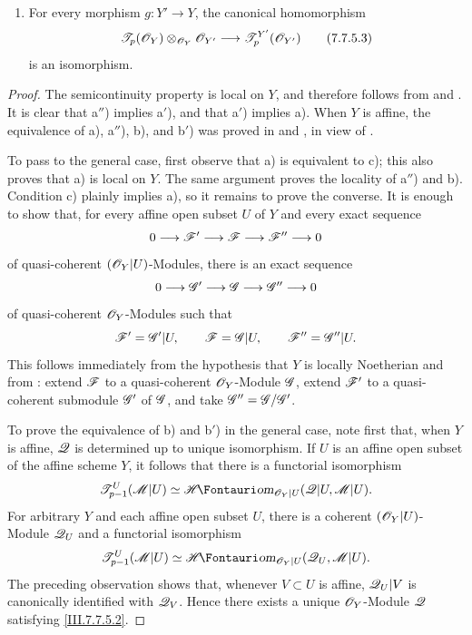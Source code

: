 {\begin{theorem}[7.7.5]
\begin{enumerate}
  \item[d)] For every morphism $g:Y'\to Y$, the canonical
    homomorphism
    \[
      \mathscr{T}_p(\mathscr{O}_Y)
      \otimes_{\mathscr{O}_Y}\mathscr{O}_{Y'}
      \longrightarrow
      \mathscr{T}^{Y'}_p(\mathscr{O}_{Y'})
      \tag{7.7.5.3}\label{III.7.7.5.3}
    \]
    is an isomorphism.
\end{enumerate}
\end{theorem}

\begin{proof}
The semicontinuity property is local on $Y$, and therefore
follows from  and .  It is
clear that a$''$) implies a$'$), and that a$'$) implies a).
When $Y$ is affine, the equivalence of a), a$''$), b), and
b$'$) was proved in  and
, in view of .

To pass to the general case, first observe that a) is
equivalent to c); this also proves that a) is local on $Y$.
The same argument proves the locality of a$''$) and b).
Condition c) plainly implies a), so it remains to prove the
converse.  It is enough to show that, for every affine open
subset $U$ of $Y$ and every exact sequence
\[
  0\longrightarrow\mathscr{F}'
  \longrightarrow\mathscr{F}
  \longrightarrow\mathscr{F}''
  \longrightarrow0
\]
of quasi-coherent $(\mathscr{O}_Y|U)$-Modules, there is an exact
sequence
\[
  0\longrightarrow\mathscr{G}'
  \longrightarrow\mathscr{G}
  \longrightarrow\mathscr{G}''
  \longrightarrow0
\]
of quasi-coherent $\mathscr{O}_Y$-Modules such that
\[
  \mathscr{F}'=\mathscr{G}'|U,
  \qquad
  \mathscr{F}=\mathscr{G}|U,
  \qquad
  \mathscr{F}''=\mathscr{G}''|U.
\]
This follows immediately from the hypothesis that $Y$ is
locally Noetherian and from : extend
$\mathscr{F}$ to a quasi-coherent $\mathscr{O}_Y$-Module $\mathscr{G}$,
extend $\mathscr{F}'$ to a quasi-coherent submodule $\mathscr{G}'$ of
$\mathscr{G}$, and take $\mathscr{G}''=\mathscr{G}/\mathscr{G}'$.

To prove the equivalence of b) and b$'$) in the general
case, note first that, when $Y$ is affine, $\mathscr{Q}$ is
determined up to unique isomorphism.  If $U$ is an affine
open subset of the affine scheme $Y$, it follows that there
is a functorial isomorphism
\[
  \sh{T}^{U}_{p-1}(\sh{M}|U)
  \simeq
  \shHom_{\sh{O}_Y|U}
    (\sh{Q}|U,\sh{M}|U).
\]
For arbitrary $Y$ and each affine open subset $U$, there is
a coherent $(\mathscr{O}_Y|U)$-Module $\mathscr{Q}_U$ and a
functorial isomorphism
\[
  \sh{T}^{U}_{p-1}(\sh{M}|U)
  \simeq
  \shHom_{\sh{O}_Y|U}
    (\sh{Q}_U,\sh{M}|U).
\]
The preceding observation shows that, whenever $V\subset U$
is affine, $\mathscr{Q}_U|V$ is canonically identified with
$\mathscr{Q}_V$.  Hence there exists a unique
$\mathscr{O}_Y$-Module $\mathscr{Q}$ satisfying
\eqref{III.7.7.5.2}.


\end{proof}}
